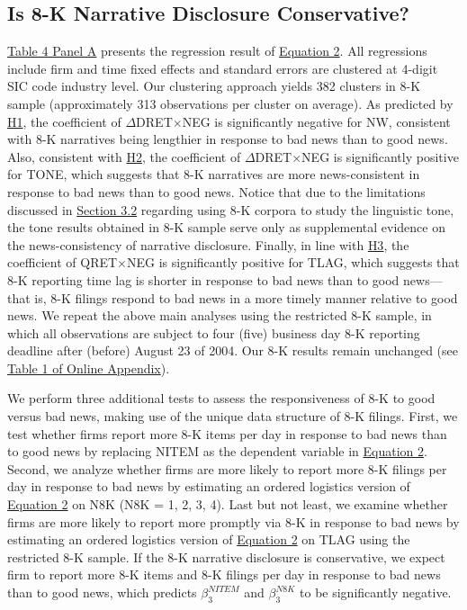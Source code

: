 \documentclass[letterpaper,11pt]{article}
\begin{document}
\begin{spacing}{1.5}
\subsection{Is 8-K Narrative Disclosure Conservative?}
\hyperref[T4PA]{Table 4 Panel A} presents the regression result of \hyperref[eq2]{Equation 2}. All regressions include firm and time fixed effects and standard errors are clustered at 4-digit SIC code industry level. Our clustering approach yields 382 clusters in 8-K sample (approximately 313 observations per cluster on average). As predicted by \hyperref[h1]{H1}, the coefficient of $\Delta$DRET$\times$NEG is significantly negative for NW, consistent with 8-K narratives being lengthier in response to bad news than to good news. Also, consistent with \hyperref[h2]{H2}, the coefficient of $\Delta$DRET$\times$NEG is significantly positive for TONE, which suggests that 8-K narratives are more news-consistent in response to bad news than to good news. Notice that due to the limitations discussed in \hyperref[sec3.2]{Section 3.2} regarding using 8-K corpora to study the linguistic tone, the tone results obtained in 8-K sample serve only as supplemental evidence on the news-consistency of narrative disclosure. Finally, in line with \hyperref[h3]{H3}, the coefficient of QRET$\times$NEG is significantly positive for TLAG, which suggests that 8-K reporting time lag is shorter in response to bad news than to good news---that is, 8-K filings respond to bad news in a more timely manner relative to good news. We repeat the above main analyses using the restricted 8-K sample, in which all observations are subject to four (five) business day 8-K reporting deadline after (before) August 23 of 2004. Our 8-K results remain unchanged (see \hyperref[oat1]{Table 1 of Online Appendix}).

We perform three additional tests to assess the responsiveness of 8-K to good versus bad news, making use of the unique data structure of 8-K filings. First, we test whether firms report more 8-K items per day in response to bad news than to good news by replacing NITEM as the dependent variable in \hyperref[eq2]{Equation 2}. Second, we analyze whether firms are more likely to report more 8-K filings per day in response to bad news by estimating an ordered logistics version of \hyperref[eq2]{Equation 2} on N8K (N8K = 1, 2, 3, 4). Last but not least, we examine whether firms are more likely to report more promptly via 8-K in response to bad news by estimating an ordered logistics version of \hyperref[eq2]{Equation 2} on TLAG using the restricted 8-K sample. If the 8-K narrative disclosure is conservative, we expect firm to report more 8-K items and 8-K filings per day in response to bad news than to good news, which predicts $\beta_3^{NITEM}$ and $\beta_3^{N8K}$ to be significantly negative.


\end{spacing}
\end{document}

